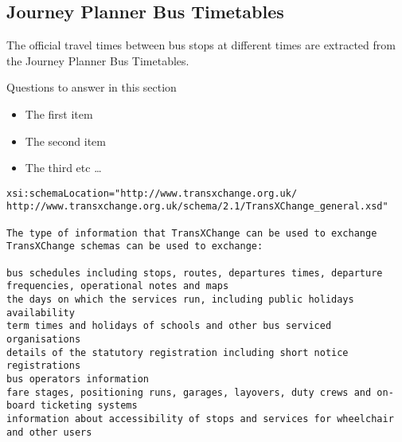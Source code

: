 \subsection{Journey Planner Bus Timetables}
The official travel times between bus stops at different times are extracted from the Journey Planner Bus Timetables.

Questions to answer in this section
\begin{itemize}
  \item The first item
  \item The second item
  \item The third etc \ldots
\end{itemize}


\begin{verbatim}
xsi:schemaLocation="http://www.transxchange.org.uk/ http://www.transxchange.org.uk/schema/2.1/TransXChange_general.xsd"

The type of information that TransXChange can be used to exchange
TransXChange schemas can be used to exchange:

bus schedules including stops, routes, departures times, departure frequencies, operational notes and maps
the days on which the services run, including public holidays availability
term times and holidays of schools and other bus serviced organisations
details of the statutory registration including short notice registrations
bus operators information
fare stages, positioning runs, garages, layovers, duty crews and on-board ticketing systems
information about accessibility of stops and services for wheelchair and other users
\end{verbatim}





